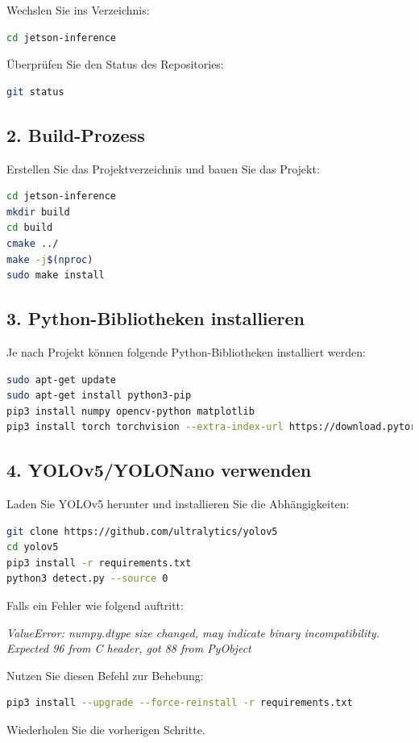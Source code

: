 \documentclass{article}
\begin{document}
Wechslen Sie ins Verzeichnis:
\begin{lstlisting}[language=bash]
cd jetson-inference
\end{lstlisting}

Überprüfen Sie den Status des Repositories:
\begin{lstlisting}[language=bash]
git status
\end{lstlisting}

\subsection*{2. Build-Prozess}
Erstellen Sie das Projektverzeichnis und bauen Sie das Projekt:
\begin{lstlisting}[language=bash]
cd jetson-inference
mkdir build
cd build
cmake ../
make -j$(nproc)
sudo make install
\end{lstlisting}

\subsection*{3. Python-Bibliotheken installieren}
Je nach Projekt können folgende Python-Bibliotheken installiert werden:

\begin{lstlisting}[language=bash]
sudo apt-get update
sudo apt-get install python3-pip
pip3 install numpy opencv-python matplotlib
pip3 install torch torchvision --extra-index-url https://download.pytorch.org/whl/cu118
\end{lstlisting}

\subsection*{4. YOLOv5/YOLONano verwenden}
Laden Sie YOLOv5 herunter und installieren Sie die Abhängigkeiten:
\begin{lstlisting}[language=bash]
git clone https://github.com/ultralytics/yolov5 
cd yolov5
pip3 install -r requirements.txt
python3 detect.py --source 0 
\end{lstlisting}

Falls ein Fehler wie folgend auftritt: 

\textit{ValueError: numpy.dtype size changed, may indicate binary incompatibility. Expected 96 from C header, got 88 
\indent from PyObject}

Nutzen Sie diesen Befehl zur Behebung:
\begin{lstlisting}[language=bash]
pip3 install --upgrade --force-reinstall -r requirements.txt
\end{lstlisting}
Wiederholen Sie die vorherigen Schritte.
\end{document}
